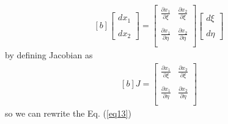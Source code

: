\documentclass[]{article}
\begin{document}
\begin{equation}\label{eq15}
	\begin{aligned}[b]
		\begin{bmatrix}
			dx_{1}\\
			\\
			dx_{2}  
		\end{bmatrix}
		= \begin{bmatrix}
			\frac{\partial x_{1}}{\partial \xi}       & \frac{\partial x_{2}}{\partial \xi} \\
			\\
			\frac{\partial x_{1}}{\partial \eta}       &\frac{\partial x_{2}}{\partial \eta}\\
		\end{bmatrix}
		\begin{bmatrix}
			d \xi\\
			\\
			d \eta
		\end{bmatrix}
	\end{aligned}
\end{equation}
%
by defining Jacobian as
\begin{equation}\label{eq16}
	\begin{aligned}[b]
		J = \begin{bmatrix}
			\frac{\partial x_{1}}{\partial \xi}       & \frac{\partial x_{2}}{\partial \xi} \\
			\\
			\frac{\partial x_{1}}{\partial \eta}       &\frac{\partial x_{2}}{\partial \eta}\\
			\end{bmatrix}
	\end{aligned}
\end{equation}
so we can rewrite the Eq. (\ref{eq13}) 
\end{document}
